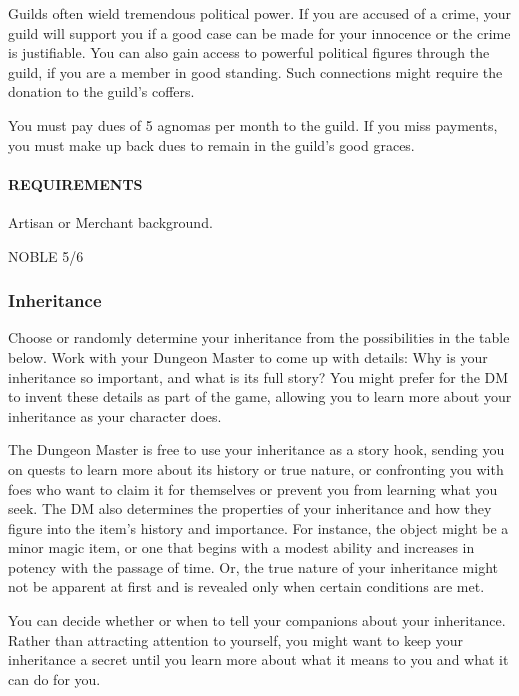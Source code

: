    Guilds often wield tremendous political power.
    If you are accused of a crime, your guild will support you if a good case can be made for your innocence or the crime is justifiable.
    You can also gain access to powerful political figures through the guild, if you are a member in good standing.
    Such connections might require the donation to the guild's coffers.

    You must pay dues of 5 agnomas per month to the guild.
    If you miss payments, you must make up back dues to remain in the guild's good graces.
    \paragraph{REQUIREMENTS} Artisan or Merchant background.

NOBLE 5/6
    \subsubsection{Inheritance} \label{feat::inheritance}
    Choose or randomly determine your inheritance from the possibilities in the table below.
    Work with your Dungeon Master to come up with details: Why is your inheritance so important, and what is its full story?
    You might prefer for the DM to invent these details as part of the game, allowing you to learn more about your inheritance as your character does.

    The Dungeon Master is free to use your inheritance as a story hook, sending you on quests to learn more about its history or true nature, or confronting you with foes who want to claim it for themselves or prevent you from learning what you seek.
    The DM also determines the properties of your inheritance and how they figure into the item's history and importance.
    For instance, the object might be a minor magic item, or one that begins with a modest ability and increases in potency with the passage of time.
    Or, the true nature of your inheritance might not be apparent at first and is revealed only when certain conditions are met.

    You can decide whether or when to tell your companions about your inheritance.
    Rather than attracting attention to yourself, you might want to keep your inheritance a secret until you learn more about what it means to you and what it can do for you.

